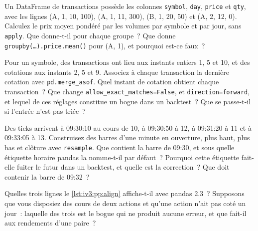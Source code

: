 \begin{question}\label{iq:iv3:python-and-pandas:19}
Un DataFrame de transactions possède les colonnes \texttt{symbol}, \texttt{day}, \texttt{price} et \texttt{qty}, avec les lignes (A, 1, 10, 100), (A, 1, 11, 300), (B, 1, 20, 50) et (A, 2, 12, 0). Calculez le prix moyen pondéré par les volumes par symbole et par jour, sans \texttt{apply}. Que donne-t-il pour chaque groupe~? Que donne \texttt{groupby(\dots).price.mean()} pour (A, 1), et pourquoi est-ce faux~?
\end{question}

\begin{question}\label{iq:iv3:python-and-pandas:20}
Pour un symbole, des transactions ont lieu aux instants entiers 1, 5 et 10, et des cotations aux instants 2, 5 et 9. Associez à chaque transaction la dernière cotation avec \texttt{pd.merge\_asof}. Quel instant de cotation obtient chaque transaction~? Que change \texttt{allow\_exact\_matches=False}, et \texttt{direction=\textquotesingle forward\textquotesingle}, et lequel de ces réglages constitue un bogue dans un backtest~? Que se passe-t-il si l'entrée n'est pas triée~?
\end{question}

\begin{question}\label{iq:iv3:python-and-pandas:21}
Des ticks arrivent à 09:30:10 au cours de 10, à 09:30:50 à 12, à 09:31:20 à 11 et à 09:33:05 à 13. Construisez des barres d'une minute en ouverture, plus haut, plus bas et clôture avec \texttt{resample}. Que contient la barre de 09:30, et sous quelle étiquette horaire pandas la nomme-t-il par défaut~? Pourquoi cette étiquette fait-elle fuiter le futur dans un backtest, et quelle est la correction~? Que doit contenir la barre de 09:32~?
\end{question}

\begin{question}\label{iq:iv3:python-and-pandas:22}
Quelles trois lignes le \cref{lst:iv3:pp:align} affiche-t-il avec pandas 2.3~? Supposons que vous disposiez des cours de deux actions et qu'une action n'ait pas coté un jour~: laquelle des trois est le bogue qui ne produit aucune erreur, et que fait-il aux rendements d'une paire~?
\label{lst:iv3:pp:align}
\end{question}

